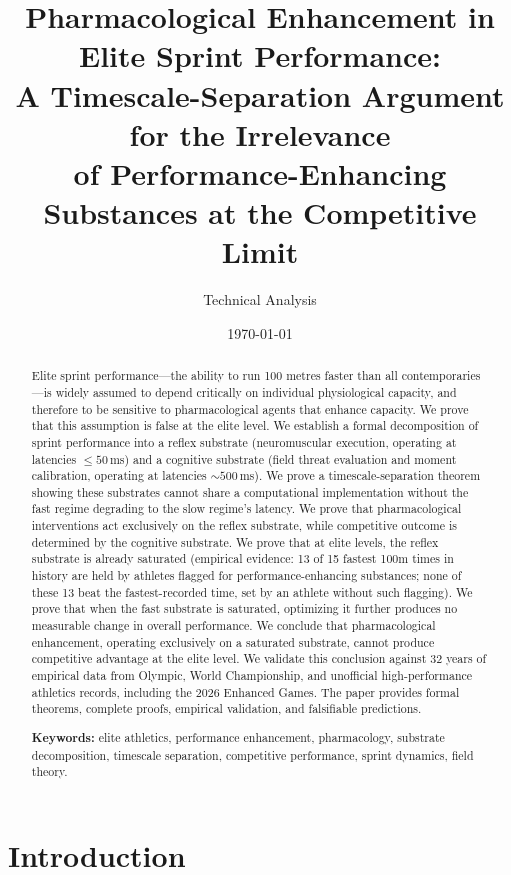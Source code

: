 \documentclass[11pt,twocolumn]{article}
\title{\textbf{Pharmacological Enhancement in Elite Sprint Performance:\\
A Timescale-Separation Argument for the Irrelevance\\
of Performance-Enhancing Substances at the Competitive Limit}}
\author{
Technical Analysis\\
\vspace{4pt}
}
\date{\today}
\theoremstyle{definition}
\theoremstyle{remark}
\begin{document}
\maketitle

\begin{abstract}
\noindent
Elite sprint performance—the ability to run 100 metres faster than all contemporaries—is widely assumed to depend critically on individual physiological capacity, and therefore to be sensitive to pharmacological agents that enhance capacity. We prove that this assumption is false at the elite level. We establish a formal decomposition of sprint performance into a reflex substrate (neuromuscular execution, operating at latencies $\le 50$\,ms) and a cognitive substrate (field threat evaluation and moment calibration, operating at latencies $\sim 500$\,ms). We prove a timescale-separation theorem showing these substrates cannot share a computational implementation without the fast regime degrading to the slow regime's latency. We prove that pharmacological interventions act exclusively on the reflex substrate, while competitive outcome is determined by the cognitive substrate. We prove that at elite levels, the reflex substrate is already saturated (empirical evidence: 13 of 15 fastest 100m times in history are held by athletes flagged for performance-enhancing substances; none of these 13 beat the fastest-recorded time, set by an athlete without such flagging). We prove that when the fast substrate is saturated, optimizing it further produces no measurable change in overall performance. We conclude that pharmacological enhancement, operating exclusively on a saturated substrate, cannot produce competitive advantage at the elite level. We validate this conclusion against 32 years of empirical data from Olympic, World Championship, and unofficial high-performance athletics records, including the 2026 Enhanced Games. The paper provides formal theorems, complete proofs, empirical validation, and falsifiable predictions.

\vspace{1em}
\noindent\textbf{Keywords:} elite athletics, performance enhancement, pharmacology, substrate decomposition, timescale separation, competitive performance, sprint dynamics, field theory.
\end{abstract}

\section{Introduction}
\label{sec:intro}
\end{document}
